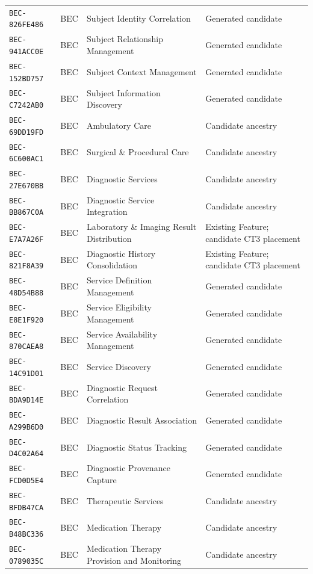 \documentclass[11pt,a4paper,openany]{book}
\begin{document}
\begin{longtable}{@{}p{.19\linewidth}p{.12\linewidth}p{.39\linewidth}p{.24\linewidth}@{}}
\texttt{BEC-826FE486} & BEC & Subject Identity Correlation & Generated candidate \\
\texttt{BEC-941ACC0E} & BEC & Subject Relationship Management & Generated candidate \\
\texttt{BEC-152BD757} & BEC & Subject Context Management & Generated candidate \\
\texttt{BEC-C7242AB0} & BEC & Subject Information Discovery & Generated candidate \\
\texttt{BEC-69DD19FD} & BEC & Ambulatory Care & Candidate ancestry \\
\texttt{BEC-6C600AC1} & BEC & Surgical \& Procedural Care & Candidate ancestry \\
\texttt{BEC-27E670BB} & BEC & Diagnostic Services & Candidate ancestry \\
\texttt{BEC-BB867C0A} & BEC & Diagnostic Service Integration & Candidate ancestry \\
\texttt{BEC-E7A7A26F} & BEC & Laboratory \& Imaging Result Distribution & Existing Feature; candidate CT3 placement \\
\texttt{BEC-821F8A39} & BEC & Diagnostic History Consolidation & Existing Feature; candidate CT3 placement \\
\texttt{BEC-48D54B88} & BEC & Service Definition Management & Generated candidate \\
\texttt{BEC-E8E1F920} & BEC & Service Eligibility Management & Generated candidate \\
\texttt{BEC-870CAEA8} & BEC & Service Availability Management & Generated candidate \\
\texttt{BEC-14C91D01} & BEC & Service Discovery & Generated candidate \\
\texttt{BEC-BDA9D14E} & BEC & Diagnostic Request Correlation & Generated candidate \\
\texttt{BEC-A299B6D0} & BEC & Diagnostic Result Association & Generated candidate \\
\texttt{BEC-D4C02A64} & BEC & Diagnostic Status Tracking & Generated candidate \\
\texttt{BEC-FCD0D5E4} & BEC & Diagnostic Provenance Capture & Generated candidate \\
\texttt{BEC-BFDB47CA} & BEC & Therapeutic Services & Candidate ancestry \\
\texttt{BEC-B48BC336} & BEC & Medication Therapy & Candidate ancestry \\
\texttt{BEC-0789035C} & BEC & Medication Therapy Provision and Monitoring & Candidate ancestry \\

\end{longtable}
\end{document}

